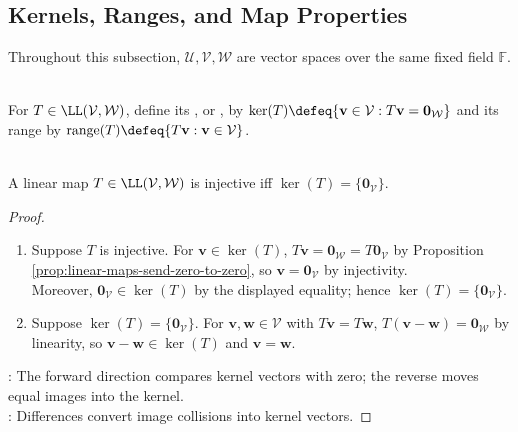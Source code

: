 \subsection{Kernels, Ranges, and Map Properties}
Throughout this subsection, $\mathcal{U},\mathcal{V},\mathcal{W}$ are vector spaces over the same fixed field $\mathbb{F}$.

\begin{definition} \label{def:kernel-and-range-linear-map} \\
For $T\in\LL(\mathcal{V},\mathcal{W})$, define its , or , by $\ker(T)\defeq\{\mathbf{v}\in\mathcal{V}:T\mathbf{v}=\mathbf{0}_{\mathcal{W}}\}$ and its range by $\operatorname{range}(T)\defeq\{T\mathbf{v}:\mathbf{v}\in\mathcal{V}\}$.
\end{definition}

\begin{proposition} \label{prop:injective-iff-kernel-zero} \\
A linear map $T\in\LL(\mathcal{V},\mathcal{W})$ is injective iff $\ker(T)=\{\mathbf{0}_{\mathcal{V}}\}$.
\begin{proof}
\begin{enumerate}[label=\roman*.]
\setlength{\itemsep}{0pt}
\item[$(\Rightarrow)$] Suppose $T$ is injective. For $\mathbf{v}\in\ker(T)$, $T\mathbf{v}=\mathbf{0}_{\mathcal{W}}=T\mathbf{0}_{\mathcal{V}}$ by Proposition \ref{prop:linear-maps-send-zero-to-zero}, so $\mathbf{v}=\mathbf{0}_{\mathcal{V}}$ by injectivity.\\
Moreover, $\mathbf{0}_{\mathcal{V}}\in\ker(T)$ by the displayed equality; hence $\ker(T)=\{\mathbf{0}_{\mathcal{V}}\}$.
\item[$(\Leftarrow)$] Suppose $\ker(T)=\{\mathbf{0}_{\mathcal{V}}\}$. For $\mathbf{v},\mathbf{w}\in\mathcal{V}$ with $T\mathbf{v}=T\mathbf{w}$, $T(\mathbf{v}-\mathbf{w})=\mathbf{0}_{\mathcal{W}}$ by linearity, so $\mathbf{v}-\mathbf{w}\in\ker(T)$ and $\mathbf{v}=\mathbf{w}$.
\end{enumerate}
: The forward direction compares kernel vectors with zero; the reverse moves equal images into the kernel.\\
: Differences convert image collisions into kernel vectors.
\end{proof}
\end{proposition}

